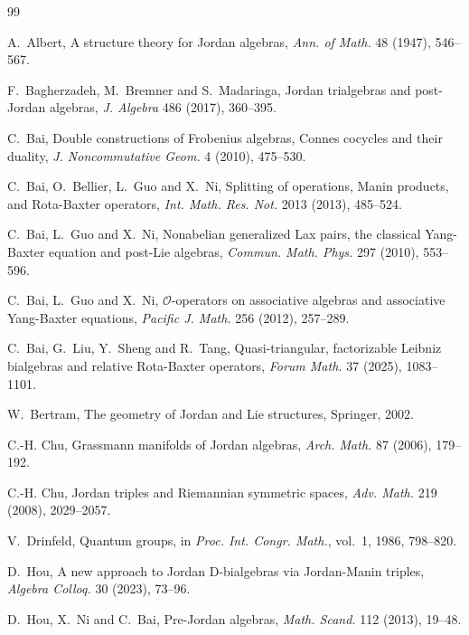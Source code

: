 \documentclass[12pt, reqno, a4paper]{amsart}
\theoremstyle{definition}
\begin{document}
\begin{thebibliography}{99}

	A.~Albert, A structure theory for Jordan algebras, \textit{Ann. of Math.} 48 (1947), 546--567.
	

	F.~Bagherzadeh, M.~Bremner and S.~Madariaga, Jordan trialgebras and post-Jordan algebras, \textit{J. Algebra} 486 (2017), 360--395.


	C.~Bai, Double constructions of Frobenius algebras, Connes cocycles and their duality, \textit{J. Noncommutative Geom.} 4 (2010), 475--530.

	C.~Bai, O.~Bellier, L.~Guo and X.~Ni, Splitting of operations, Manin products, and Rota-Baxter operators, \textit{Int. Math. Res. Not.} 2013 (2013), 485--524.

	C.~Bai, L.~Guo and X.~Ni, Nonabelian generalized Lax pairs, the classical Yang-Baxter equation and post-Lie algebras, \textit{Commun. Math. Phys.} 297 (2010), 553--596.

	C.~Bai, L.~Guo and X.~Ni, $\mathcal{O}$-operators on associative algebras and associative Yang-Baxter equations, \textit{Pacific J. Math.} 256 (2012), 257--289.

	C.~Bai, G.~Liu, Y.~Sheng and R.~Tang, Quasi-triangular, factorizable Leibniz bialgebras and relative Rota-Baxter operators, \textit{Forum Math.} 37 (2025), 1083--1101.


	W.~Bertram, The geometry of Jordan and Lie structures, Springer, 2002.
	

	C.-H. Chu, Grassmann manifolds of Jordan algebras, \textit{Arch. Math.} 87 (2006), 179--192.

	C.-H. Chu, {Jordan} triples and {Riemannian} symmetric spaces, \textit{Adv. Math.} 219 (2008), 2029--2057.

	V.~Drinfeld, Quantum groups, in \textit{Proc. Int. Congr. Math.}, vol.~1, 1986, 798--820.

	D.~Hou, A new approach to Jordan D-bialgebras via Jordan-Manin triples, \textit{Algebra Colloq.} 30 (2023), 73--96.

	D.~Hou, X.~Ni and C.~Bai, Pre-Jordan algebras, \textit{Math. Scand.} 112 (2013), 19--48.


\end{thebibliography}
\end{document}
